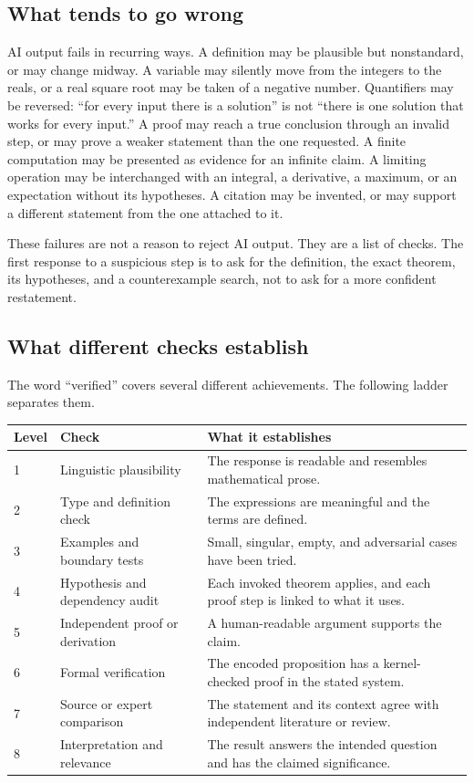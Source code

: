 \subsection*{What tends to go wrong}
AI output fails in recurring ways. A definition may be plausible but nonstandard, or may change midway. A variable may silently move from the integers to the reals, or a real square root may be taken of a negative number. Quantifiers may be reversed: ``for every input there is a solution'' is not ``there is one solution that works for every input.'' A proof may reach a true conclusion through an invalid step, or may prove a weaker statement than the one requested. A finite computation may be presented as evidence for an infinite claim. A limiting operation may be interchanged with an integral, a derivative, a maximum, or an expectation without its hypotheses. A citation may be invented, or may support a different statement from the one attached to it.

These failures are not a reason to reject AI output. They are a list of checks. The first response to a suspicious step is to ask for the definition, the exact theorem, its hypotheses, and a counterexample search, not to ask for a more confident restatement.

\subsection*{What different checks establish}
The word ``verified'' covers several different achievements. The following ladder separates them.

\begin{center}
\begin{tabularx}{\textwidth}{@{}p{}>{\raggedright\arraybackslash}p{}X@{}}
\toprule
Level & Check & What it establishes\\\midrule
1 & Linguistic plausibility & The response is readable and resembles mathematical prose.\\
2 & Type and definition check & The expressions are meaningful and the terms are defined.\\
3 & Examples and boundary tests & Small, singular, empty, and adversarial cases have been tried.\\
4 & Hypothesis and dependency audit & Each invoked theorem applies, and each proof step is linked to what it uses.\\
5 & Independent proof or derivation & A human-readable argument supports the claim.\\
6 & Formal verification & The encoded proposition has a kernel-checked proof in the stated system.\\
7 & Source or expert comparison & The statement and its context agree with independent literature or review.\\
8 & Interpretation and relevance & The result answers the intended question and has the claimed significance.\\
\bottomrule
\end{tabularx}
\end{center}

